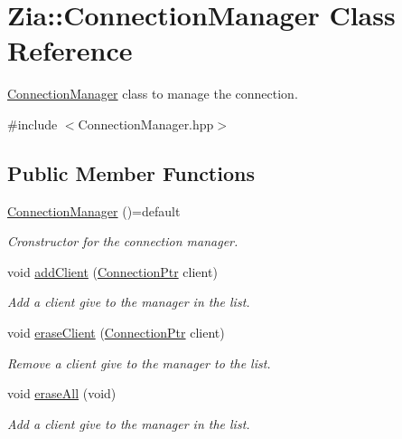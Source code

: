 \hypertarget{class_zia_1_1_connection_manager}{}\section{Zia\+:\+:Connection\+Manager Class Reference}
\label{class_zia_1_1_connection_manager}


\hyperlink{class_zia_1_1_connection_manager}{Connection\+Manager} class to manage the connection.  




{\ttfamily \#include $<$Connection\+Manager.\+hpp$>$}

\subsection*{Public Member Functions}
\begin{DoxyCompactItemize}
\item 
\hyperlink{class_zia_1_1_connection_manager_a863585668f747d6fb35b15b12f6fb4a4}{Connection\+Manager} ()=default
\begin{DoxyCompactList}\small\item\em Cronstructor for the connection manager. \end{DoxyCompactList}\item 
void \hyperlink{class_zia_1_1_connection_manager_a556bcbe3969171deba4900c08feb7d93}{add\+Client} (\hyperlink{_connection_manager_8hpp_a0e374529952c927bd9f59c9acbccf624}{Connection\+Ptr} client)
\begin{DoxyCompactList}\small\item\em Add a client give to the manager in the list. \end{DoxyCompactList}\item 
void \hyperlink{class_zia_1_1_connection_manager_a61efd54810ec831b994c7ef148bec2ae}{erase\+Client} (\hyperlink{_connection_manager_8hpp_a0e374529952c927bd9f59c9acbccf624}{Connection\+Ptr} client)
\begin{DoxyCompactList}\small\item\em Remove a client give to the manager to the list. \end{DoxyCompactList}\item 
void \hyperlink{class_zia_1_1_connection_manager_ac1db00d9a69520616bc20e0ac1ea311f}{erase\+All} (void)
\begin{DoxyCompactList}\small\item\em Add a client give to the manager in the list. \end{DoxyCompactList}\end{DoxyCompactItemize}


